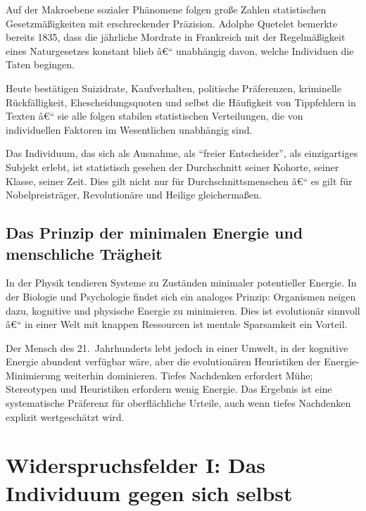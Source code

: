 ﻿\documentclass[12pt, a4paper]{article}
\begin{document}
Auf der Makroebene sozialer Phänomene folgen große Zahlen statistischen
Gesetzmäßigkeiten mit erschreckender Präzision. Adolphe Quetelet bemerkte bereits
1835, dass die jährliche Mordrate in Frankreich mit der Regelmäßigkeit eines
Naturgesetzes konstant blieb â€“ unabhängig davon, welche Individuen die Taten
begingen.

Heute bestätigen Suizidrate, Kaufverhalten, politische Präferenzen, kriminelle
Rückfälligkeit, Ehescheidungsquoten und selbst die Häufigkeit von Tippfehlern
in Texten â€“ sie alle folgen stabilen statistischen Verteilungen, die von
individuellen Faktoren im Wesentlichen unabhängig sind.

Das Individuum, das sich als Ausnahme, als \enquote{freier Entscheider}, als
einzigartiges Subjekt erlebt, ist statistisch gesehen der Durchschnitt seiner
Kohorte, seiner Klasse, seiner Zeit. Dies gilt nicht nur für Durchschnittsmenschen â€“
es gilt für Nobelpreisträger, Revolutionäre und Heilige gleichermaßen.

\subsection{Das Prinzip der minimalen Energie und menschliche Trägheit}

In der Physik tendieren Systeme zu Zuständen minimaler potentieller Energie.
In der Biologie und Psychologie findet sich ein analoges Prinzip: Organismen
neigen dazu, kognitive und physische Energie zu minimieren. Dies ist evolutionär
sinnvoll â€“ in einer Welt mit knappen Ressourcen ist mentale Sparsamkeit ein Vorteil.

Der Mensch des 21.~Jahrhunderts lebt jedoch in einer Umwelt, in der kognitive
Energie abundent verfügbar wäre, aber die evolutionären Heuristiken der
Energie-Minimierung weiterhin dominieren. Tiefes Nachdenken erfordert Mühe;
Stereotypen und Heuristiken erfordern wenig Energie. Das Ergebnis ist eine
systematische Präferenz für oberflächliche Urteile, auch wenn tiefes Nachdenken
explizit wertgeschätzt wird.

\section{Widerspruchsfelder I: Das Individuum gegen sich selbst}
\end{document}
